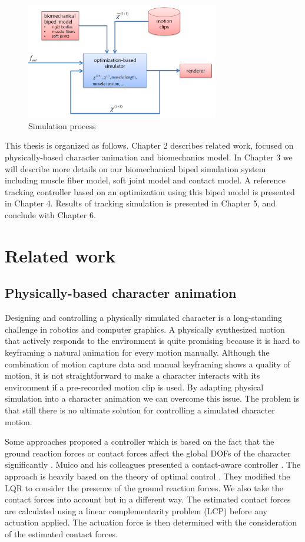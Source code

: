 \documentclass[master,english,final]{kaist-ucs}
\begin{document}
\begin{figure}[h!]
\label{probdef}
  \centering
  \includegraphics[width=0.75\textwidth]{overview2}
  \caption{Simulation process}
\end{figure}

This thesis is organized as follows. Chapter 2 describes related work,
focused on physically-based character animation and biomechanics model.
In Chapter 3 we will describe more details on our biomechanical biped simulation system
including muscle fiber model, soft joint model and contact model.
A reference tracking controller based on an optimization
using this biped model is presented in Chapter 4.
Results of tracking simulation is presented in Chapter 5,
and conclude with Chapter 6.

\chapter{Related work}

\section{Physically-based character animation}
Designing and controlling a physically simulated character is a long-standing
challenge in robotics and computer graphics. A physically
synthesized motion that actively responds to the environment is quite
promising because it is hard to keyframing a natural animation for every motion
manually. Although the combination of motion capture data and manual keyframing
shows a quality of motion, it is not straightforward to make a character
interacts with its environment if a pre-recorded motion clip is used.
By adapting physical simulation into a character animation we can overcome
this issue. The problem is that still there is no ultimate solution for controlling
a simulated character motion.

Some approaches proposed a controller which is based on the fact
that the ground reaction forces or contact forces affect the global
DOFs of the character significantly \cite{SCA07:249-258:2007, journals/tog/MuicoLPP09}.
Muico and his colleagues
presented a contact-aware controller \cite{journals/tog/MuicoLPP09}.
The approach is
heavily based on the theory of optimal control \cite{lewis}.
They modified the LQR to consider the presence of the ground reaction forces.
We also take the contact forces into account but in a different way.
The estimated contact forces are calculated using a linear complementarity
problem (LCP) before any actuation applied. The actuation force is then
determined with the consideration of the estimated contact forces.
\end{document}
